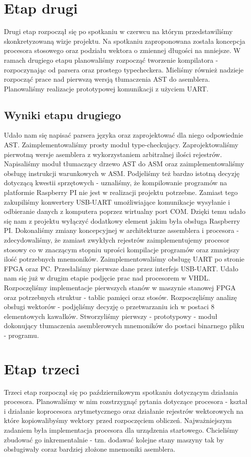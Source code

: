 \section{Etap drugi}
Drugi etap rozpoczął się po spotkaniu w czerwcu na którym przedstawiliśmy skonkretyzowaną wizje projektu. Na spotkaniu zaproponowana została koncepcja procesora stosowego oraz podziału wektora o zmiennej długości na mniejsze. W ramach drugiego etapu planowaliśmy rozpocząć tworzenie kompilatora - rozpoczynając od parsera oraz prostego typecheckera. Mieliśmy również nadzieje rozpocząć prace nad pierwszą wersją tłumaczenia AST do asemblera. Planowaliśmy realizacje prototypowej komunikacji z użyciem UART.
\subsection{Wyniki etapu drugiego}
Udało nam się napisać parsera języka oraz zaprojektować dla niego odpowiednie AST. Zaimplementowaliśmy prosty moduł type-checkujący. Zaprojektowaliśmy pierwotną wersje asemblera z wykorzystaniem arbitralnej ilości rejestrów. Napisaliśmy moduł tłumaczący drzewo AST do ASM oraz zaimplementowaliśmy obsługę instrukcji warunkowych w ASM. Podjeliśmy też bardzo istotną decyzję dotyczącą kwestii sprzętowych - uznaliśmy, że kompilowanie programów na platformie Raspberry PI nie jest w realizacji projektu potrzebne. Zamiast tego zakupiliśmy konwertery USB-UART umożliwiające komunikacje wysyłanie i odbieranie danych z komputera poprzez wirtualny port COM. Dzięki temu udało się nam z projektu wyłączyć dodatkowy element jakim była obsługa Raspberry PI. Dokonaliśmy zmiany koncepcyjnej w architekturze assemblera i procesora - zdecydowaliśmy, że zamiast zwykłych rejestrów zaimplementujemy procesor stosowy co w znaczącym stopniu uprości kompilacje programów oraz zmniejszy ilość potrzebnych mnemoników. Zaimplementowaliśmy obsługę UART po stronie FPGA oraz PC. Przesłaliśmy pierwsze dane przez interfejs USB-UART. Udało nam się już w drugim etapie podjęcie prac nad procesorem w VHDL. Rozpoczęliśmy implementacje pierwszych stanów w maszynie stanowej FPGA oraz potrzebnych struktur - tablic pamięci oraz stosów. Rozpoczęliśmy analizę obsługi wektorów - podjęliśmy decyzję o przetwarzaniu ich w postaci 8 elementowych kawałków. Stworzyliśmy pierwszy - prototypowy - moduł dokonujący tłumaczenia asemblerowych mnemoników do postaci binarnego pliku - programu.
\section{Etap trzeci}
Trzeci etap rozpoczął się po październikowym spotkaniu dotyczącym działania procesora. Planowaliśmy w nim rozstrzygnąć pytania dotyczące procesora - kształ i działanie koprocesora arytmetycznego oraz działanie rejestrów wektorowych na które kopiowalibyśmy wektory przed rozpoczęciem obliczeń. Najważniejszym zadaniem była implementacja procesora dla urządzenia startowego. Chcieliśmy zbudować go inkrementalnie - tzn. dodawać kolejne stany maszyny tak by obsługiwały coraz bardziej złożone mnemoniki asemblera.
